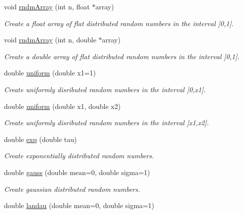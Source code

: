 \begin{DoxyCompactItemize}
void \hyperlink{class_d_d4hep_1_1_simulation_1_1_geant4_random_aaf9f4a7acf4d65ce0b3f6b19486d473d}{rndm\+Array} (int n, float $\ast$array)
\begin{DoxyCompactList}\small\item\em Create a float array of flat distributed random numbers in the interval \mbox{]}0,1\mbox{]}. \end{DoxyCompactList}\item 
void \hyperlink{class_d_d4hep_1_1_simulation_1_1_geant4_random_a45700086c1a78f0982bd5539e9263895}{rndm\+Array} (int n, double $\ast$array)
\begin{DoxyCompactList}\small\item\em Create a double array of flat distributed random numbers in the interval \mbox{]}0,1\mbox{]}. \end{DoxyCompactList}\item 
double \hyperlink{class_d_d4hep_1_1_simulation_1_1_geant4_random_af0c23cab921aa21e6707eae5091aba15}{uniform} (double x1=1)
\begin{DoxyCompactList}\small\item\em Create uniformly disributed random numbers in the interval \mbox{]}0,x1\mbox{]}. \end{DoxyCompactList}\item 
double \hyperlink{class_d_d4hep_1_1_simulation_1_1_geant4_random_a5e717c2a88ed9c72dcfb8e2de1c4bef3}{uniform} (double x1, double x2)
\begin{DoxyCompactList}\small\item\em Create uniformly disributed random numbers in the interval \mbox{]}x1,x2\mbox{]}. \end{DoxyCompactList}\item 
double \hyperlink{class_d_d4hep_1_1_simulation_1_1_geant4_random_a676f18f9a0f12e26e67f5390c2f6a5b7}{exp} (double tau)
\begin{DoxyCompactList}\small\item\em Create exponentially distributed random numbers. \end{DoxyCompactList}\item 
double \hyperlink{class_d_d4hep_1_1_simulation_1_1_geant4_random_a759d26cbc394bdbd9d34196c33b7419e}{gauss} (double mean=0, double sigma=1)
\begin{DoxyCompactList}\small\item\em Create gaussian distributed random numbers. \end{DoxyCompactList}\item 
double \hyperlink{class_d_d4hep_1_1_simulation_1_1_geant4_random_a44860eb96afcbda002a7845e8319eb4f}{landau} (double mean=0, double sigma=1)

\end{DoxyCompactItemize}
